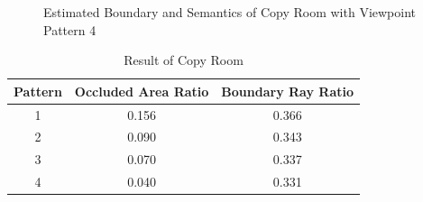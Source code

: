 \documentclass[11pt, a4paper,oneside,chapterprefix=false]{scrbook}
\begin{document}
\vspace{30pt}

\begin{figure}[H]
    \centering
      \label{fig:copy b 200 6} \hfill
     \label{fig:copy s 200 6}
    \caption{Estimated Boundary and Semantics of Copy Room with Viewpoint Pattern 4}
    \label{fig:copy 6}
\end{figure}

\vspace{90pt}

\begin{table}[H]
    \centering
    \begin{tabular}{|c|c|c|}
        \hline
        \textbf{Pattern} & \textbf{Occluded Area Ratio} & \textbf{Boundary Ray Ratio} \\
        \hline
        1 & 0.156 & 0.366 \\
        2 & 0.090 & 0.343 \\
		3 & 0.070 & 0.337 \\
		4 & 0.040 & 0.331 \\
        \hline
    \end{tabular}
    \caption{Result of Copy Room}
    \label{tab:result of copy room}
\end{table}
\end{document}

